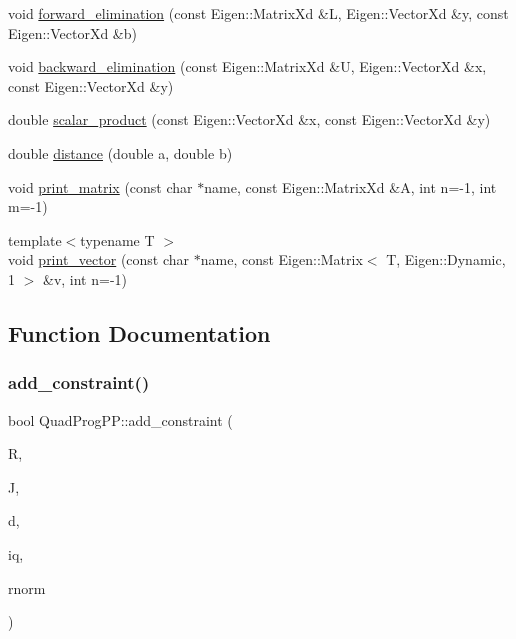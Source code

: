 \begin{DoxyCompactItemize}
void \hyperlink{namespaceQuadProgPP_acabfedbcb7167f67f0bc97d5528589ee}{forward\+\_\+elimination} (const Eigen\+::\+Matrix\+Xd \&L, Eigen\+::\+Vector\+Xd \&y, const Eigen\+::\+Vector\+Xd \&b)
\item 
void \hyperlink{namespaceQuadProgPP_a2ff18ea1c11c56ab14a9e9db30a35e60}{backward\+\_\+elimination} (const Eigen\+::\+Matrix\+Xd \&U, Eigen\+::\+Vector\+Xd \&x, const Eigen\+::\+Vector\+Xd \&y)
\item 
double \hyperlink{namespaceQuadProgPP_ad183104d932d3764cc3223e89591c347}{scalar\+\_\+product} (const Eigen\+::\+Vector\+Xd \&x, const Eigen\+::\+Vector\+Xd \&y)
\item 
double \hyperlink{namespaceQuadProgPP_a02250c1dfa52b656b38147eeb1b3df48}{distance} (double a, double b)
\item 
void \hyperlink{namespaceQuadProgPP_affeed53f80844aaf2be84ac637cfd212}{print\+\_\+matrix} (const char $\ast$name, const Eigen\+::\+Matrix\+Xd \&A, int n=-\/1, int m=-\/1)
\item 
{\footnotesize template$<$typename T $>$ }\\void \hyperlink{namespaceQuadProgPP_a5a7e0a2f22b7bf72667010d6cff1dac2}{print\+\_\+vector} (const char $\ast$name, const Eigen\+::\+Matrix$<$ T, Eigen\+::\+Dynamic, 1 $>$ \&v, int n=-\/1)
\end{DoxyCompactItemize}


\subsection{Function Documentation}
\hypertarget{namespaceQuadProgPP_a4096d7195aed4c795b80e5d923b43dc7}{}\label{namespaceQuadProgPP_a4096d7195aed4c795b80e5d923b43dc7} 
\subsubsection{\texorpdfstring{add\+\_\+constraint()}{add\_constraint()}}
{\footnotesize\ttfamily bool Quad\+Prog\+P\+P\+::add\+\_\+constraint (\begin{DoxyParamCaption}\item[{Eigen\+::\+Matrix\+Xd \&}]{R,  }\item[{Eigen\+::\+Matrix\+Xd \&}]{J,  }\item[{Eigen\+::\+Vector\+Xd \&}]{d,  }\item[{int \&}]{iq,  }\item[{double \&}]{rnorm }\end{DoxyParamCaption})}



